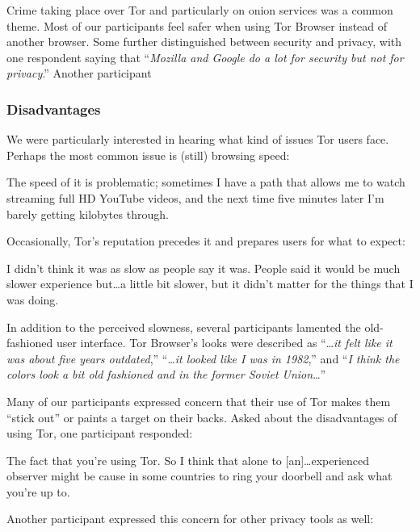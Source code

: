 Crime taking place over Tor and particularly on onion services was a common
theme.  Most of our participants feel safer when using Tor Browser instead of another
browser.  Some further distinguished between security and privacy, with one
respondent saying that ``\emph{Mozilla and Google do a lot for security but not
for privacy}.''  Another participant 

\subsubsection{Disadvantages}

We were particularly interested in hearing what kind of issues Tor users face.
Perhaps the most common issue is (still) browsing speed:

\begin{displayquote}
The speed of it is problematic; sometimes I have a path that allows me to watch
streaming full HD YouTube videos, and the next time five minutes later I'm
barely getting kilobytes through.
\end{displayquote}

Occasionally, Tor's reputation precedes it and prepares users for what to
expect:

\begin{displayquote}
I didn't think it was as slow as people say it was. People said it would be much
slower experience but\ldots a little bit slower, but it didn't matter for the
things that I was doing.
\end{displayquote}

In addition to the perceived slowness, several participants lamented the
old-fashioned user interface.  Tor Browser's looks were described as
``\dots\emph{it felt like it was about five years outdated},'' ``\dots\emph{it
looked like I was in 1982},'' and ``\emph{I think the colors look a bit old
fashioned and in the former Soviet Union}\dots''

Many of our participants expressed concern that their use of Tor makes them
``stick out'' or paints a target on their backs.  Asked about the disadvantages
of using Tor, one participant responded:

\begin{displayquote}
The fact that you're using Tor.  So I think that alone to [an]\dots experienced
observer might be cause in some countries to ring your doorbell and ask what
you're up to.
\end{displayquote}

Another participant expressed this concern for other privacy tools as well:

